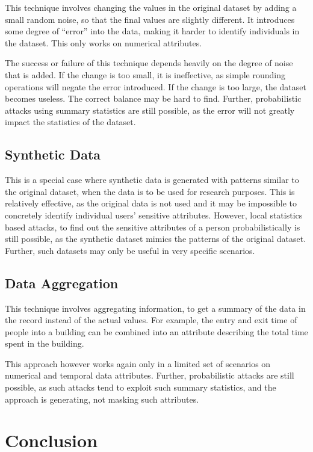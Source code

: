 \documentclass[11pt, a4paper]{article}
\begin{document}
This technique involves changing the values in the original dataset by adding a small random noise, so that the final values are slightly different. It introduces some degree of ``error'' into the data, making it harder to identify individuals in the dataset. This only works on numerical attributes.

The success or failure of this technique depends heavily on the degree of noise that is added. If the change is too small, it is ineffective, as simple rounding operations will negate the error introduced. If the change is too large, the dataset becomes useless. The correct balance may be hard to find. Further, probabilistic attacks using summary statistics are still possible, as the error will not greatly impact the statistics of the dataset.

\subsection{Synthetic Data}

This is a special case where synthetic data is generated with patterns similar to the original dataset, when the data is to be used for research purposes. This is relatively effective, as the original data is not used and it may be impossible to concretely identify individual users' sensitive attributes. However, local statistics based attacks, to find out the sensitive attributes of a person probabilistically is still possible, as the synthetic dataset mimics the patterns of the original dataset. Further, such datasets may only be useful in very specific scenarios.

\subsection{Data Aggregation}

This technique involves aggregating information, to get a summary of the data in the record instead of the actual values. For example, the entry and exit time of people into a building can be combined into an attribute describing the total time spent in the building.

This approach however works again only in a limited set of scenarios on numerical and temporal data attributes. Further, probabilistic attacks are still possible, as such attacks tend to exploit such summary statistics, and the approach is generating, not masking such attributes.

\section{Conclusion}
\end{document}
